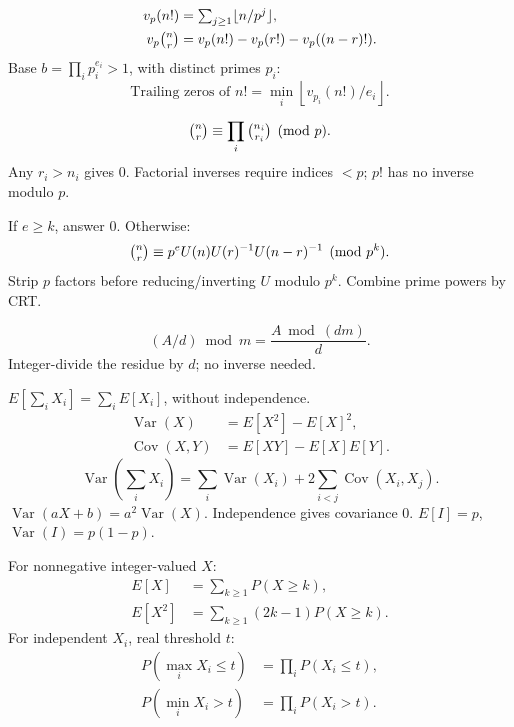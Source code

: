 \[
 \begin{aligned}
 v_p(n!)&=\textstyle\sum_{j\ge1}\lfloor n/p^j\rfloor,\\
 v_p\tbinom nr&=v_p(n!)-v_p(r!)-v_p((n-r)!).
 \end{aligned}
\]
Base $b=\prod_i p_i^{e_i}>1$, with distinct primes $p_i$:
\[
\text{Trailing zeros of }n!
 =\min_i\left\lfloor v_{p_i}(n!)/e_i\right\rfloor.
\]

\[
 \tbinom nr\equiv\prod_i\tbinom{n_i}{r_i}\pmod p.
\]
Any $r_i>n_i$ gives 0. Factorial inverses require
indices $<p$; $p!$ has no inverse modulo $p$.

If $e\ge k$, answer 0. Otherwise:
\[
 \tbinom nr\equiv
 p^e U(n)U(r)^{-1}U(n-r)^{-1}\pmod{p^k}.
\]
Strip $p$ factors before reducing/inverting $U$ modulo $p^k$.
Combine prime powers by CRT.

\symbols{$A$: integer numerator; $d>0$: divisor with $d\mid A$;
$m>0$: modulus; $A\bmod(dm)\in[0,dm)$.}
\[
 (A/d)\bmod m=\frac{A\bmod(dm)}d.
\]
Integer-divide the residue by $d$; no inverse needed.


$E[\sum_iX_i]=\sum_iE[X_i]$, without independence.
\[
 \begin{aligned}
 \operatorname{Var}(X)&=E[X^2]-E[X]^2,\\
 \operatorname{Cov}(X,Y)&=E[XY]-E[X]E[Y].
 \end{aligned}
\]
\[
 \operatorname{Var}\left(\textstyle\sum_i X_i\right)
 =\textstyle\sum_i\operatorname{Var}(X_i)+2\sum_{i<j}\operatorname{Cov}(X_i,X_j).
\]
$\operatorname{Var}(aX+b)=a^2\operatorname{Var}(X)$.
Independence gives covariance 0.
$E[I]=p$, $\operatorname{Var}(I)=p(1-p)$.

For nonnegative integer-valued $X$:
\[
 \begin{aligned}
 E[X]&=\textstyle\sum_{k\ge1}P(X\ge k),\\
 E[X^2]&=\textstyle\sum_{k\ge1}(2k-1)P(X\ge k).
 \end{aligned}
\]
For independent $X_i$, real threshold $t$:
\[
 \begin{aligned}
 P(\max_i X_i\le t)&=\textstyle\prod_iP(X_i\le t),\\
 P(\min_i X_i>t)&=\textstyle\prod_iP(X_i>t).
 \end{aligned}
\]

